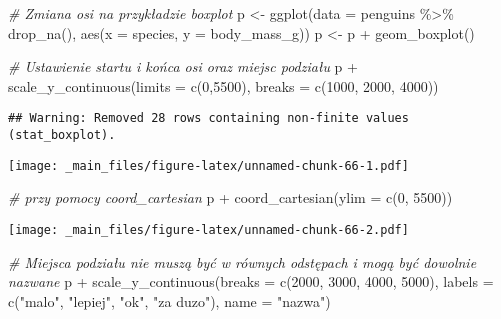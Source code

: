 \documentclass[
]{book}
\newenvironment{Shaded}{\begin{snugshade}}{\end{snugshade}}
\newcommand{\AttributeTok}[1]{\textcolor[rgb]{0.77,0.63,0.00}{#1}}
\newcommand{\CommentTok}[1]{\textcolor[rgb]{0.56,0.35,0.01}{\textit{#1}}}
\newcommand{\DecValTok}[1]{\textcolor[rgb]{0.00,0.00,0.81}{#1}}
\newcommand{\FunctionTok}[1]{\textcolor[rgb]{0.00,0.00,0.00}{#1}}
\newcommand{\NormalTok}[1]{#1}
\newcommand{\OtherTok}[1]{\textcolor[rgb]{0.56,0.35,0.01}{#1}}
\newcommand{\SpecialCharTok}[1]{\textcolor[rgb]{0.00,0.00,0.00}{#1}}
\newcommand{\StringTok}[1]{\textcolor[rgb]{0.31,0.60,0.02}{#1}}
\begin{document}
\begin{Shaded}
\begin{Highlighting}[]
\CommentTok{\# Zmiana osi na przykładzie boxplot}
\NormalTok{p }\OtherTok{\textless{}{-}} \FunctionTok{ggplot}\NormalTok{(}\AttributeTok{data =}\NormalTok{ penguins }\SpecialCharTok{\%\textgreater{}\%} \FunctionTok{drop\_na}\NormalTok{(), }\FunctionTok{aes}\NormalTok{(}\AttributeTok{x =}\NormalTok{ species, }\AttributeTok{y =}\NormalTok{ body\_mass\_g))}
\NormalTok{p }\OtherTok{\textless{}{-}}\NormalTok{ p }\SpecialCharTok{+} \FunctionTok{geom\_boxplot}\NormalTok{()}

\CommentTok{\# Ustawienie startu i końca osi oraz miejsc podziału}
\NormalTok{p }\SpecialCharTok{+} \FunctionTok{scale\_y\_continuous}\NormalTok{(}\AttributeTok{limits =} \FunctionTok{c}\NormalTok{(}\DecValTok{0}\NormalTok{,}\DecValTok{5500}\NormalTok{), }\AttributeTok{breaks =} \FunctionTok{c}\NormalTok{(}\DecValTok{1000}\NormalTok{, }\DecValTok{2000}\NormalTok{, }\DecValTok{4000}\NormalTok{))}
\end{Highlighting}
\end{Shaded}

\begin{verbatim}
## Warning: Removed 28 rows containing non-finite values (stat_boxplot).
\end{verbatim}

\texttt{[image: \_main\_files/figure-latex/unnamed-chunk-66-1.pdf]}

\begin{Shaded}
\begin{Highlighting}[]
\CommentTok{\# przy pomocy coord\_cartesian}
\NormalTok{p }\SpecialCharTok{+} \FunctionTok{coord\_cartesian}\NormalTok{(}\AttributeTok{ylim =} \FunctionTok{c}\NormalTok{(}\DecValTok{0}\NormalTok{, }\DecValTok{5500}\NormalTok{))}
\end{Highlighting}
\end{Shaded}

\texttt{[image: \_main\_files/figure-latex/unnamed-chunk-66-2.pdf]}

\begin{Shaded}
\begin{Highlighting}[]
\CommentTok{\# Miejsca podziału nie muszą być w równych odstępach i mogą być dowolnie nazwane}
\NormalTok{p }\SpecialCharTok{+} \FunctionTok{scale\_y\_continuous}\NormalTok{(}\AttributeTok{breaks =} \FunctionTok{c}\NormalTok{(}\DecValTok{2000}\NormalTok{, }\DecValTok{3000}\NormalTok{, }\DecValTok{4000}\NormalTok{, }\DecValTok{5000}\NormalTok{), }
                       \AttributeTok{labels =} \FunctionTok{c}\NormalTok{(}\StringTok{"malo"}\NormalTok{, }\StringTok{"lepiej"}\NormalTok{, }\StringTok{"ok"}\NormalTok{, }\StringTok{"za duzo"}\NormalTok{), }
                       \AttributeTok{name =} \StringTok{"nazwa"}\NormalTok{)}
\end{Highlighting}
\end{Shaded}
\end{document}
